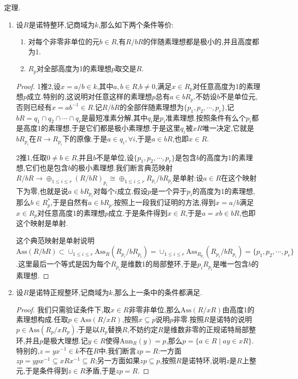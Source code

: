 定理.
\begin{enumerate}
	\item 设$R$是诺特整环,记商域为$k$,那么如下两个条件等价:
	\begin{enumerate}
		\item 对每个非零非单位的元$b\in R$,有$R/bR$的伴随素理想都是极小的,并且高度都为1.
		\item $R_p$对全部高度为1的素理想$p$取交是$R$.
	\end{enumerate}
	\begin{proof}
		
		1推2,设$x=a/b\in k$,其中$a,b\in R$,$b\not=0$,满足$x\in R_p$对任意高度为1的素理想$p$成立.特别的,这说明对任意这样的素理想$p$总有$a\in bR_p$.不妨设$b$不是单位元,否则已经有$x=ab^{-1}\in R$.记$R/bR$的全部伴随素理想为$\{p_1,p_2,\cdots,p_r\}$,记$bR=q_1\cap q_2\cap\cdots\cap q_r$是最短准素分解,其中$q_i$是$p_i$准素理想.按照条件有么个$p_i$都是高度1的素理想,于是它们都是极小素理想.于是这里$q_i$被$xR$唯一决定,它就是$bR_{p_i}$在$R\to R_{p_i}$下的原像.于是$a\in q_i,\forall i$,于是$a\in bR$,也即$x\in R$.
		
		2推1,任取$0\not=b\in R$,并且$b$不是单位,设$\{p_1,p_2,\cdots,p_r\}$是包含$b$的高度为1的素理想,它们也是包含$b$的极小素理想.我们断言典范映射$R/bR\to\oplus_{1\le i\le r}(R/bR)_{p_i}\cong\oplus_{1\le i\le r}R_{p_i}/bR_{p_i}$是单射:设$a\in R$在这个映射下为零,也就是说$a\in bR_{p_i}$对每个$i$成立.假设$p$是一个异于$p_i$的高度为1的素理想,那么$b\in R_p^*$,于是自然有$a\in bR_p$.按照上一段我们证明的方法,得到$x=a/b$满足$x\in R_p$对任意高度1的素理想$p$成立.于是条件得到$x\in R$,于是$a=xb\in bR$,也即这个映射是单射.
		
		这个典范映射是单射说明$\mathrm{Ass}(R/bR)\subset\cup_{1\le i\le r}\mathrm{Ass}_R(R_{p_i}/bR_{p_i})=\cup_{1\le i\le r}\mathrm{Ass}_{R_{p_i}}(R_{p_i}/bR_{p_i})=\{p_1,p_2,\cdots,p_r\}$.这里最后一个等式是因为每个$R_{p_i}$是维数1的局部整环,于是$p_iR_{p_i}$是唯一包含$b$的素理想.
	\end{proof}
	\item 设$R$是诺特正规整环,记商域为$k$,那么上一条中的条件都满足.
	\begin{proof}
		
		我们只需验证条件下,取$x\in R$非零非单位,那么$\mathrm{Ass}(R/xR)$由高度1的素理想构成.任取$p\in\mathrm{Ass}(R/xR)$,按照$x\subseteq p$说明$p$非零.按照$R$是诺特的说明$p\in\mathrm{Ass}(R_p/xR_p)$.于是以$R_p$替换$R$,不妨约定$R$是维数非零的正规诺特局部整环,并且$p$是极大理想.记$y\in R$使得$\mathrm{Ann}_R(y)=p$,那么$p=\{a\in R\mid ay\in xR\}$.特别的,$z=yx^{-1}\in k$不在$R$中.我们断言$zp=R$:一方面$zp=ypx^{-1}\subseteq xRx^{-1}\subseteq R$;另一方面如果$zp\subseteq p$,按照$R$是诺特环,说明$z$是$R$上整元,于是条件得到$z\in R$矛盾,于是$zp=R$.
		

\end{proof}
\end{enumerate}
